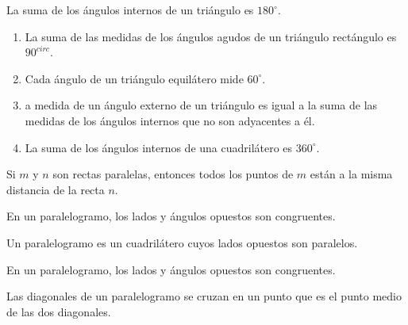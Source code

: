     \begin{teo}
	La suma de los ángulos internos de un triángulo es $180^{\circ}$.\\
    \end{teo}

	\begin{cor}
	    \begin{enumerate}[\bfseries a)]
		\item La suma de las medidas de los ángulos agudos de un triángulo rectángulo es $90^{circ}$.
		\item Cada ángulo de un triángulo equilátero mide $60^{\circ}$.
		\item a medida de un ángulo externo de un triángulo es igual a la suma de las medidas de los ángulos internos que no son adyacentes a él.
		\item La suma de los ángulos internos de una cuadrilátero es $360^{\circ}$.\\
	    \end{enumerate}
	\end{cor}

    \begin{teo}
	Si $m$ y $n$ son rectas paralelas, entonces todos los puntos de $m$ están a la misma distancia de la recta $n$.\\
    \end{teo}

	    \begin{proposicion}
		En un paralelogramo, los lados y ángulos opuestos son congruentes.\\
	    \end{proposicion}

    \begin{def.}
	Un paralelogramo es un cuadrilátero cuyos lados opuestos son paralelos.\\
    \end{def.}

	    \begin{proposicion}
		En un paralelogramo, los lados y ángulos opuestos son congruentes.\\
	    \end{proposicion}

	    \begin{proposicion}
		Las diagonales de un paralelogramo se cruzan en un punto que es el punto medio de las dos diagonales.\\
	    \end{proposicion}

